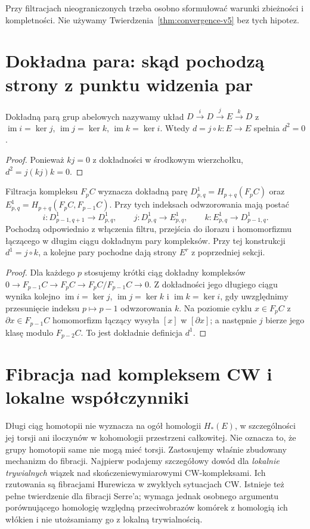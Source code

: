 \begin{uwaga}
Przy filtracjach nieograniczonych trzeba osobno sformułować
warunki zbieżności i kompletności. Nie używamy
Twierdzenia~\ref{thm:convergence-v5} bez tych hipotez.
\end{uwaga}

\section{Dokładna para: skąd pochodzą strony z punktu widzenia par}
\begin{definicja}
Dokładną parą grup abelowych nazywamy układ
$D\xrightarrow{i}D\xrightarrow{j}E\xrightarrow{k}D$
z $\operatorname{im}i=\ker j$,
$\operatorname{im}j=\ker k$,
$\operatorname{im}k=\ker i$.
Wtedy $d=j\circ k:E\to E$ spełnia $d^2=0$.
\end{definicja}
\begin{proof}
Ponieważ $kj=0$ z dokładności w środkowym wierzchołku,
$d^2=j(kj)k=0$.
\end{proof}
\begin{stwierdzenie}
Filtracja kompleksu $F_pC$ wyznacza dokładną parę
$D^1_{p,q}=H_{p+q}(F_pC)$ oraz
$E^1_{p,q}=H_{p+q}(F_pC,F_{p-1}C)$.
Przy tych indeksach odwzorowania mają postać
\[
 i:D^1_{p-1,q+1}\to D^1_{p,q},\qquad
 j:D^1_{p,q}\to E^1_{p,q},\qquad
 k:E^1_{p,q}\to D^1_{p-1,q}.
\]
Pochodzą odpowiednio z włączenia filtru,
przejścia do ilorazu i homomorfizmu łączącego
w długim ciągu dokładnym pary kompleksów.
Przy tej konstrukcji $d^1=j\circ k$, a kolejne pary
pochodne dają strony $E^r$ z poprzedniej sekcji.
\end{stwierdzenie}
\begin{proof}
Dla każdego $p$ stosujemy krótki ciąg dokładny kompleksów
$0\to F_{p-1}C\to F_pC\to F_pC/F_{p-1}C\to0$.
Z dokładności jego długiego ciągu wynika kolejno
$\operatorname{im}i=\ker j$, $\operatorname{im}j=\ker k$
i $\operatorname{im}k=\ker i$, gdy uwzględnimy przesunięcie
indeksu $p\mapsto p-1$ odwzorowania $k$.
Na poziomie cyklu $x\in F_pC$ z $\partial x\in F_{p-1}C$
homomorfizm łączący wysyła $[x]$ w $[\partial x]$;
a następnie $j$ bierze jego klasę modulo $F_{p-2}C$.
To jest dokładnie definicja $d^1$.
\end{proof}

\section{Fibracja nad kompleksem CW i lokalne współczynniki}
Długi ciąg homotopii nie wyznacza na ogół homologii $H_*(E)$, w szczególności jej torsji ani iloczynów w kohomologii przestrzeni całkowitej. Nie oznacza to, że grupy homotopii same nie mogą mieć torsji.
Zastosujemy właśnie zbudowany mechanizm do fibracji.
Najpierw podajemy szczegółowy dowód dla \emph{lokalnie trywialnych}
wiązek nad skończeniewymiarowymi CW-kompleksami. Ich rzutowania
są fibracjami Hurewicza w zwykłych sytuacjach CW. Istnieje też
pełne twierdzenie dla fibracji Serre'a; wymaga jednak osobnego
argumentu porównującego homologię względną przeciwobrazów komórek
z homologią ich włókien i nie utożsamiamy go z lokalną trywialnością.

